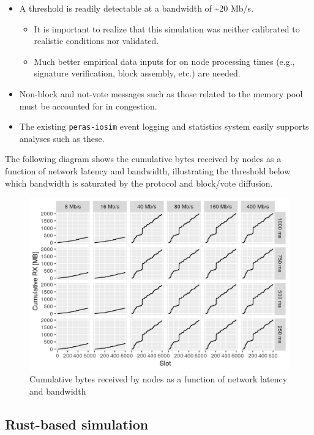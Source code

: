 \documentclass[10pt]{article}
\providecommand{\tightlist}{%
  \setlength{\itemsep}{0pt}\setlength{\parskip}{0pt}}
\begin{document}
\begin{itemize}
\tightlist
\item
  A threshold is readily detectable at a bandwidth of \textasciitilde20
  Mb/s.

  \begin{itemize}
  \tightlist
  \item
    It is important to realize that this simulation was neither
    calibrated to realistic conditions nor validated.
  \item
    Much better empirical data inputs for on node processing times
    (e.g., signature verification, block assembly, etc.) are needed.
  \end{itemize}
\item
  Non-block and not-vote messages such as those related to the memory
  pool must be accounted for in congestion.
\item
  The existing \texttt{peras-iosim} event logging and statistics system
  easily supports analyses such as these.
\end{itemize}

The following diagram shows the cumulative bytes received by nodes as a
function of network latency and bandwidth, illustrating the threshold
below which bandwidth is saturated by the protocol and block/vote
diffusion.

\begin{figure}
\centering
\includegraphics{../diagrams/sim-expts/congestion.png}
\caption{Cumulative bytes received by nodes as a function of network
latency and bandwidth}
\end{figure}

\subsection{Rust-based simulation}\label{rust-based-simulation}
\end{document}
